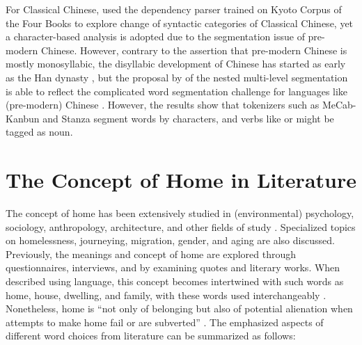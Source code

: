 For Classical Chinese, \textcite{li2020evolution} used the dependency parser trained on Kyoto Corpus of the Four Books to explore change of syntactic categories of Classical Chinese, yet a character-based analysis is adopted due to the segmentation issue of pre-modern Chinese. However, contrary to the assertion that pre-modern Chinese is mostly monosyllabic, the disyllabic development of Chinese has started as early as the Han dynasty \parencite{zhou2009,chang2008}, but the proposal by \textcite{lee2012classical} of the nested multi-level segmentation is able to reflect the complicated word segmentation challenge for languages like (pre-modern) Chinese . However, the results show that tokenizers such as MeCab-Kanbun and Stanza segment words by characters, and verbs like  or  might be tagged as noun.

\section{The Concept of Home in Literature}
The concept of home has been extensively studied in (environmental) psychology, sociology, anthropology, architecture, and other fields of study \parencite{samanani2019house,mallett2004understanding,moore2000placing,sixsmith1986meaning}. Specialized topics on homelessness, journeying, migration, gender, and aging are also discussed. Previously, the meanings and concept of home are explored through questionnaires, interviews, and by examining quotes and literary works. When described using language, this concept becomes intertwined with such words as home, house, dwelling, and family, with these words used interchangeably \parencite{mallett2004understanding,sixsmith1986meaning}. Nonetheless, home is ``not only of belonging but also of potential alienation when attempts to make home fail or are subverted'' \parencite{samanani2019house}. The emphasized aspects of different word choices from literature can be summarized as follows: 

